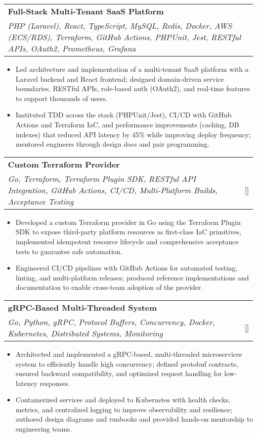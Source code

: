 \documentclass[a4paper,10pt]{article}
\makeatletter
\newcommand{\resumeProject}[4]{
\vspace{0.5mm}\item
    \begin{tabular*}{0.98\textwidth}[t]{l@{\extracolsep{\fill}}r}
        \textbf{#1} & \textit{\footnotesize{#3}} \\
        \footnotesize{\textit{#2}} & \footnotesize{#4}
    \end{tabular*}
    \vspace{-2.4mm}
}
\newcommand{\resumeItemListStart}{\begin{itemize}[leftmargin=*,labelsep=1mm,itemsep=0.5mm]}
\newcommand{\resumeItemListEnd}{\end{itemize}\vspace{-2mm}}
\makeatother
\begin{document}
\resumeProject
  {Full-Stack Multi-Tenant SaaS Platform}
  {PHP (Laravel), React, TypeScript, MySQL, Redis, Docker, AWS (ECS/RDS), Terraform, GitHub Actions, PHPUnit, Jest, RESTful APIs, OAuth2, Prometheus, Grafana}
  {}
  {}
\resumeItemListStart
  \item Led architecture and implementation of a multi-tenant SaaS platform with a Laravel backend and React frontend; designed domain-driven service boundaries, RESTful APIs, role-based auth (OAuth2), and real-time features to support thousands of users.
  \item Instituted TDD across the stack (PHPUnit/Jest), CI/CD with GitHub Actions and Terraform IaC, and performance improvements (caching, DB indexes) that reduced API latency by 45\% while improving deploy frequency; mentored engineers through design docs and pair programming.
\resumeItemListEnd

\resumeProject
  {Custom Terraform Provider}
  {Go, Terraform, Terraform Plugin SDK, RESTful API Integration, GitHub Actions, CI/CD, Multi-Platform Builds, Acceptance Testing}
  {}
  {{}[\href{https://github.com/Mohammed-Omair/terraform-provider-quote}{\textcolor{darkblue}{\faGithub}}]}
\resumeItemListStart
  \item Developed a custom Terraform provider in Go using the Terraform Plugin SDK to expose third-party platform resources as first-class IaC primitives, implemented idempotent resource lifecycle and comprehensive acceptance tests to guarantee safe automation.
  \item Engineered CI/CD pipelines with GitHub Actions for automated testing, linting, and multi-platform releases; produced reference implementations and documentation to enable cross-team adoption of the provider.
\resumeItemListEnd

\resumeProject
  {gRPC-Based Multi-Threaded System}
  {Go, Python, gRPC, Protocol Buffers, Concurrency, Docker, Kubernetes, Distributed Systems, Monitoring}
  {}
  {{}[\href{https://github.com/Mohammed-Omair/Pet-Adoption-System-gRPC}{\textcolor{darkblue}{\faGithub}}]}
\resumeItemListStart
  \item Architected and implemented a gRPC-based, multi-threaded microservices system to efficiently handle high concurrency; defined protobuf contracts, ensured backward compatibility, and optimized request handling for low-latency responses.
  \item Containerized services and deployed to Kubernetes with health checks, metrics, and centralized logging to improve observability and resilience; authored design diagrams and runbooks and provided hands-on mentorship to engineering teams.
\resumeItemListEnd
\end{document}
